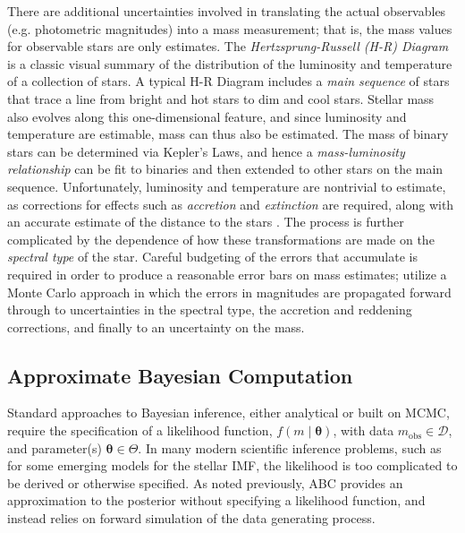 \documentclass[12pt]{article}
\newcommand{\btheta}{\boldsymbol{\theta}}
\newcommand{\mobs}{m_{\text{obs}}}
\begin{document}
There are additional uncertainties involved in translating the actual observables  (e.g. photometric magnitudes) into a mass measurement; that is, the mass values for observable stars are only estimates. The {\it Hertzsprung-Russell (H-R) Diagram} is a classic visual summary of the distribution of the luminosity and temperature of a collection of stars. A typical H-R Diagram includes a {\it main sequence} of stars that trace a line from bright and hot stars to dim and cool stars. Stellar mass also evolves along this one-dimensional feature, and since luminosity and temperature are estimable, mass can thus also be estimated. The mass of binary stars can be determined via Kepler's Laws, and hence a {\it mass-luminosity relationship} can be fit to binaries and then extended to other stars on the main sequence. Unfortunately, luminosity and temperature are nontrivial to estimate, as corrections for effects such as {\it accretion} and {\it extinction} are required, along with an accurate estimate of the distance to the stars \citep{Da-Rio:2010aa}. 
The process is further complicated by the dependence of how these transformations are made on the {\it spectral type} of the star. Careful budgeting of the errors that accumulate is required in order to produce a reasonable error bars on mass estimates; \cite{Da-Rio:2010aa} utilize a Monte Carlo approach in which the errors in magnitudes are propagated forward through to uncertainties in the spectral type, the accretion and reddening corrections, and finally to an uncertainty on the mass.  


\subsection{Approximate Bayesian Computation}

Standard approaches to Bayesian inference, either analytical or built on
MCMC, require the specification of a
likelihood function, $f(m \mid \btheta)$, with data $\mobs \in \mathcal D$, 
and parameter(s) $\btheta \in \Theta$. In many modern scientific inference 
problems, such as for some emerging models for the stellar IMF, the likelihood is too complicated to be derived or otherwise
specified. 
As noted previously, ABC provides an approximation to the posterior
without specifying a likelihood function, and instead relies on forward simulation of the data generating
process.
\end{document}

